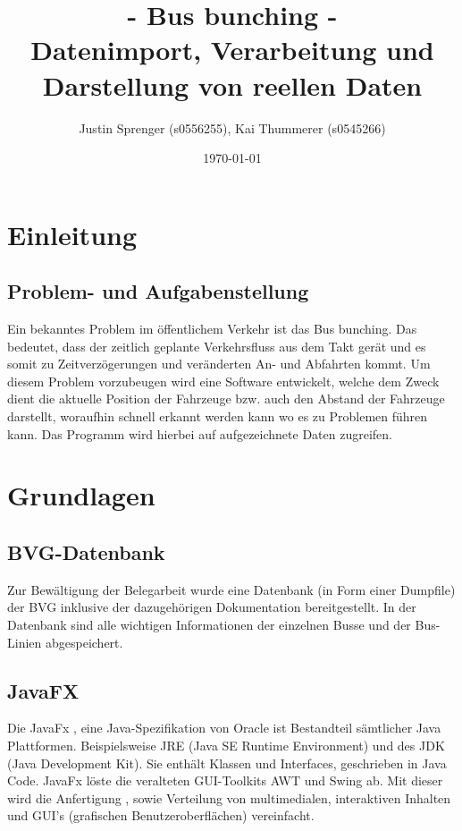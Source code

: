 \documentclass[a4paper, 12.5pt]{scrartcl}
\begin{document}
\begin{titlepage}
\author{Justin Sprenger (s0556255), 
Kai Thummerer (s0545266)} 
\title{- Bus bunching -\\
Datenimport, Verarbeitung und Darstellung von reellen Daten} 
\date{\today} 
\maketitle
\end{titlepage}

\tableofcontents
\newpage
\section{Einleitung}
\subsection{Problem- und Aufgabenstellung}
Ein bekanntes Problem im öffentlichem Verkehr ist das Bus bunching. Das bedeutet, dass der zeitlich geplante Verkehrsfluss aus dem Takt gerät und es somit zu Zeitverzögerungen und veränderten An- und Abfahrten kommt. Um diesem Problem vorzubeugen wird eine Software entwickelt, welche dem Zweck dient die aktuelle Position der Fahrzeuge bzw. auch den Abstand der Fahrzeuge darstellt, woraufhin schnell erkannt werden kann wo es zu Problemen führen kann.
Das Programm wird hierbei auf aufgezeichnete Daten zugreifen.

\section{Grundlagen}
\subsection{BVG-Datenbank}
Zur Bewältigung der Belegarbeit wurde eine Datenbank (in Form einer Dumpfile) der BVG inklusive der dazugehörigen Dokumentation bereitgestellt. In der Datenbank sind alle wichtigen Informationen der einzelnen Busse und der Bus-Linien abgespeichert.

\subsection{JavaFX} 

Die JavaFx , eine Java-Spezifikation von Oracle ist Bestandteil sämtlicher Java Plattformen. Beispielsweise JRE (Java SE Runtime Environment) und des JDK (Java Development Kit). Sie enthält Klassen und Interfaces, geschrieben in Java Code.
JavaFx löste die veralteten GUI-Toolkits AWT und Swing ab.
Mit dieser wird die Anfertigung , sowie Verteilung von multimedialen, interaktiven Inhalten und GUI’s (grafischen Benutzeroberflächen) vereinfacht.\\
\end{document}

